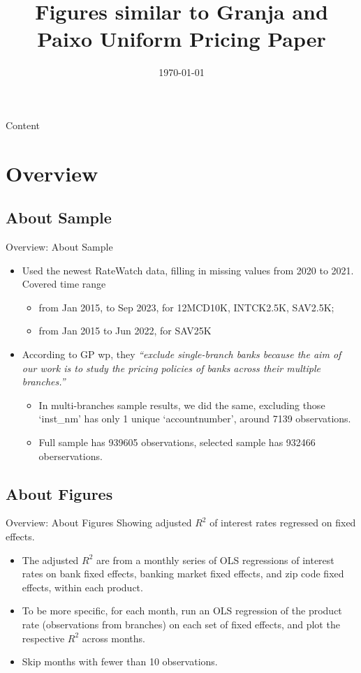 \documentclass{beamer}
\title{Figures similar to Granja and Paixo Uniform Pricing Paper}
\date{\today}
\begin{document}
\begin{frame}
  \titlepage
\end{frame}

\begin{frame}{Content}
  \tableofcontents
\end{frame}

\section{Overview}
\subsection{About Sample}
\begin{frame}{Overview: About Sample}
    \begin{itemize}
        \item Used the newest RateWatch data, filling in missing values from 2020 to 2021. Covered time range
        \begin{itemize}
            \item from Jan 2015, to Sep 2023, for 12MCD10K, INTCK2.5K, SAV2.5K;
            \item from Jan 2015 to Jun 2022, for SAV25K
        \end{itemize}
        \item According to GP wp, they \textit{“exclude single-branch banks because the aim of our work is to study the pricing policies of banks across their multiple branches.”}
        \begin{itemize}
            \item In multi-branches sample results, we did the same, excluding those ‘inst\_nm’ has only 1 unique ‘accountnumber’, around 7139 observations.
            \item Full sample has 939605 observations, selected sample has 932466 oberservations.
        \end{itemize}
    \end{itemize}
\end{frame}

\subsection{About Figures}
\begin{frame}{Overview: About Figures}
Showing adjusted $R^2$ of interest rates regressed on fixed effects.
    \begin{itemize}
        \item The adjusted $R^2$ are from a monthly series of OLS regressions of interest rates on bank fixed effects, banking market fixed effects, and zip code fixed effects, within each product.
        \item To be more specific, for each month, run an OLS regression of the product rate (observations from branches) on each set of fixed effects, and plot the respective $R^2$ across months.
        \item Skip months with fewer than 10 observations.
    \end{itemize}
\end{frame}
\end{document}
